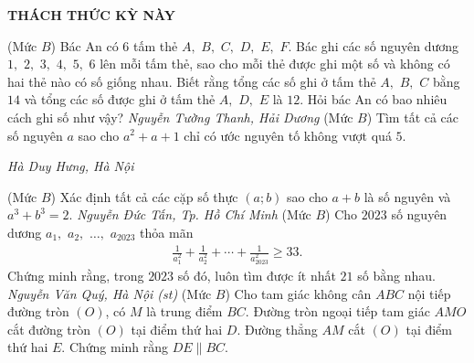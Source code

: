 \begin{center}
	\vspace*{-5pt}
	\textbf{\color{thachthuctoanhoc}\color{thachthuctoanhoc}\color{thachthuctoanhoc}THÁCH THỨC KỲ NÀY}
	\vspace*{-5pt}
\end{center}
\begin{multicols}{2}
	\setlength{\abovedisplayskip}{4pt}
	\setlength{\belowdisplayskip}{4pt}
	{}
	(Mức $B$) Bác An có $6$ tấm thẻ $A,$ $B,$ $C,$ $D,$ $E,$ $F$. Bác ghi các số nguyên dương $1,$ $2,$ $3,$ $4,$ $5,$ $6$ lên mỗi tấm thẻ, sao cho mỗi thẻ được ghi một số và không có hai thẻ nào có số giống nhau. Biết rằng tổng các số ghi ở tấm thẻ $A,$ $B,$ $C$ bằng $14$ và tổng các số được ghi ở tấm thẻ $A,$ $D,$ $E$ là $12$. Hỏi bác An có bao nhiêu cách ghi số như vậy?
	\vskip 0.3cm
	\hfill	\textit{Nguyễn Tường Thanh, Hải Dương}
	\vskip 0.3cm
	{}
	(Mức $B$) Tìm tất cả các số nguyên $a$ sao cho $a^2+a+1$ chỉ có ước nguyên tố không vượt quá $5$. 
	\begin{flushright}
		\textit{Hà Duy Hưng, Hà Nội}
	\end{flushright}
	{}
	(Mức $B$) Xác định tất cả các cặp số thực $(a;b)$ sao cho $a+b$ là số nguyên và $a^3+b^3=2$. 
	\vskip 0.1cm
	\hfill	\textit{Nguyễn Đức Tấn, Tp. Hồ Chí Minh}
	\vskip 0.1cm
	{}
	(Mức $B$) Cho $2023$ số nguyên dương $a_1,$ $a_2,$ $\ldots,$ $a_{2023}$ thỏa mãn
	\begin{align*}
		\frac{1}{a_1^2}+\frac{1}{a_2^2}+\cdots+\frac{1}{a_{2023}^2}\ge 33.
	\end{align*}
	Chứng minh rằng, trong $2023$ số đó, luôn tìm được ít nhất $21$ số bằng nhau.  
	\vskip 0.1cm
	\hfill	\textit{Nguyễn Văn Quý, Hà Nội (st)}
	\vskip 0.1cm
	{}
	(Mức $B$) Cho tam giác không cân $ABC$ nội tiếp đường tròn $(O)$, có $M$ là trung điểm $BC$. Đường tròn ngoại tiếp tam giác $AMO$ cắt đường tròn $(O)$ tại điểm thứ hai $D$. Đường thẳng $AM$ cắt $(O)$  tại điểm thứ hai $E$. Chứng minh rằng $DE\| BC$. 
	\begin{center}
		\begin{tikzpicture}[thachthuctoanhoc,scale=0.5, node font=\small]

\end{tikzpicture}
\end{center}
\end{multicols}
